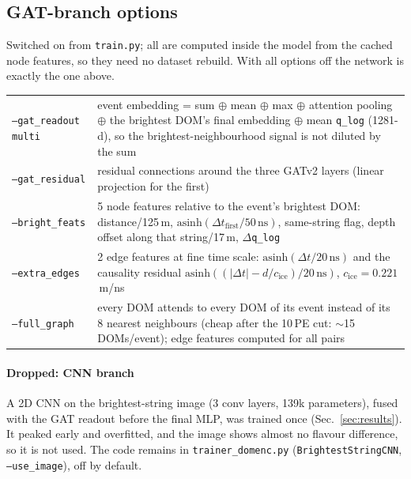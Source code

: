 \documentclass[11pt,a4paper]{article}
\newcommand{\code}[1]{\texttt{#1}}
\begin{document}
\subsection{GAT-branch options}\label{sec:gatopts}
Switched on from \code{train.py}; all are computed inside the model from the cached node features, so they need no
dataset rebuild. With all options off the network is exactly the one above.
\begin{tabularx}{\textwidth}{lY}
\toprule
\code{--gat\_readout multi} & event embedding = sum $\oplus$ mean $\oplus$ max $\oplus$ attention pooling $\oplus$ the brightest DOM's
  final embedding $\oplus$ mean \code{q\_log} (1281-d), so the brightest-neighbourhood signal is not diluted by the sum\\
\code{--gat\_residual} & residual connections around the three GATv2 layers (linear projection for the first)\\
\code{--bright\_feats} & 5 node features relative to the event's brightest DOM: distance/125\,m, $\mathrm{asinh}(\Delta t_\mathrm{first}/50\,\mathrm{ns})$,
  same-string flag, depth offset along that string/17\,m, $\Delta$\code{q\_log}\\
\code{--extra\_edges} & 2 edge features at fine time scale: $\mathrm{asinh}(\Delta t/20\,\mathrm{ns})$ and the causality residual
  $\mathrm{asinh}((|\Delta t|-d/c_\mathrm{ice})/20\,\mathrm{ns})$, $c_\mathrm{ice}=0.221$\,m/ns\\
\code{--full\_graph} & every DOM attends to every DOM of its event instead of its 8 nearest neighbours (cheap after the
  10\,PE cut: $\sim$15 DOMs/event); edge features computed for all pairs\\
\bottomrule
\end{tabularx}

\paragraph{Dropped: CNN branch} A 2D CNN on the brightest-string image (3 conv layers, 139k parameters), fused with the
GAT readout before the final MLP, was trained once (Sec.~\ref{sec:results}). It peaked early and overfitted, and the
image shows almost no flavour difference, so it is not used. The code remains in \code{trainer\_domenc.py}
(\code{BrightestStringCNN}, \code{--use\_image}), off by default.

\end{document}
